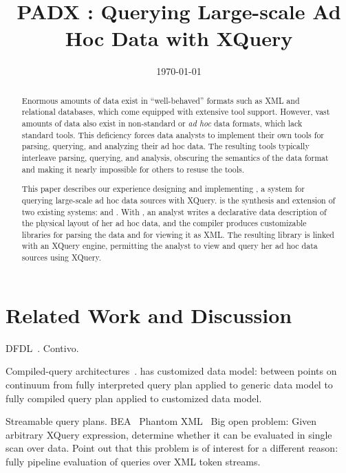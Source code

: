 \documentclass[nocopyrightspace]{sigplanconf}
\title{PADX : Querying Large-scale Ad Hoc Data with XQuery}
\date{\today}
\begin{document}
\maketitle
\begin{abstract}
Enormous amounts of data exist in ``well-behaved'' formats
such as XML and relational databases, which come equipped with
extensive tool support.  However,  vast amounts of data also exist
in non-standard or \textit{ad hoc} data formats, which lack standard
tools. This deficiency forces data analysts to implement their own tools for
parsing, querying, and analyzing their ad hoc data.  The 
resulting tools typically interleave parsing, querying, and analysis,
obscuring the semantics of the data format and making it nearly
impossible for others to resuse the tools.

This paper describes our experience designing and implementing
\padx{}, a system for querying large-scale ad hoc data sources with
XQuery.  \padx{} is the synthesis and extension of two existing
systems: \pads{} and \Galax{}. With \padx{}, an analyst writes a
declarative data description of the physical layout of her ad hoc
data, and the \pads{} compiler produces customizable libraries for
parsing the data and for viewing it as XML.  The resulting library is
linked with an XQuery engine, permitting the analyst to view and query
her ad hoc data sources using XQuery.
\end{abstract}







\section{Related Work and Discussion}
\label{section:relatedwork}
\label{section:future}

DFDL~\cite{dfdl}. Contivo.  

Compiled-query architectures~\cite{daytona}.  \padx{} has customized
data model: between points on continuum from fully interpreted query
plan applied to generic data model to fully compiled query plan
applied to customized data model.

Streamable query plans. 
BEA~\cite{DBLP:journals/vldb/FlorescuHKLRWCS04}
Phantom XML~\cite{rose:villard:2005}
Big open problem: Given arbitrary XQuery expression, determine whether
it can be evaluated in single scan over data.  Point out that this
problem is of interest for a different reason: fully pipeline
evaluation of queries over XML token streams.
\end{document}
